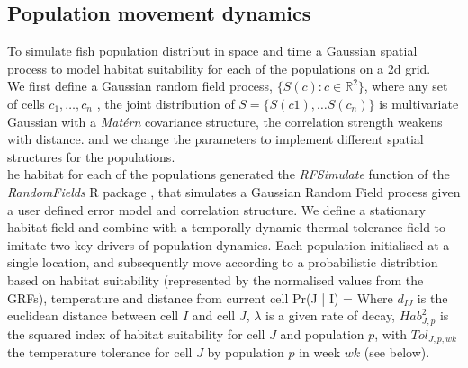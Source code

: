 \documentclass[review]{elsarticle}
\let\oldequation\equation
\let\oldendequation\endequation
\renewenvironment{equation}
 {\linenomathNonumbers\oldequation}
 {\oldendequation\endlinenomath}
\begin{document}
\subsection{Population movement dynamics}

To simulate  fish population
distribut in space and time a Gaussian spatial process  to
model habitat suitability for each of the populations on a 2d grid. \\

We first define a Gaussian random
field process, $\{S(c) :
c \in \mathbb{R}^2\}$,  where
 any set of cells $c_{1}, \dots, c_{n}$ , the joint distribution of $S =
\{S(c1),\dots S(c_{n})\}$ is multivariate Gaussian with a \textit{Matérn}
covariance structure,
 the correlation strength weakens with
distance.
 and we change the parameters to
implement different spatial structures for the populations. \\

he habitat for each of the
populations  generated 
the \textit{RFSimulate} function of the \textit{RandomFields} R package
\citep{Schlater2015}, that simulates a Gaussian Random Field process given a
user defined error model and correlation structure. We define a stationary
habitat field and combine with a temporally dynamic thermal tolerance field to
imitate two key drivers of population dynamics. Each population
 initialised at a single location, and subsequently
move according to a probabilistic
distribtion based on habitat suitability (represented by the
normalised values from the GRFs), temperature and distance
from current cell 
\begin{equation}
	Pr(J | I) = 
\end{equation}
Where $d_{IJ}$ is the euclidean distance between cell $I$ and cell $J$,
$\lambda$ is a given rate of decay, $Hab_{J,p}^2$ is the squared index of
habitat suitability for cell $J$ and population $p$, with $Tol_{J,p,wk}$ the
temperature tolerance for cell $J$ by population $p$ in week $wk$ (see
below).\\
\end{document}
